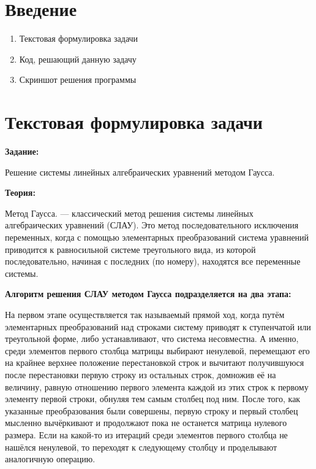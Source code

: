 \documentclass[12pt,a4paper]{scrartcl}
\begin{document}
\tableofcontents %

\newpage

\section{Введение}
\label{sec:intro}

\begin{enumerate}
 \item Текстовая формулировка задачи
 \item Код, решающий данную задачу
 \item Скриншот решения программы
\end{enumerate}
\section{Текстовая формулировка задачи} 
\textbf {Задание:} 

Решение системы линейных алгебраических уравнений методом Гаусса.

\textbf{Теория:}

Метод Гаусса\cite{Метод Гаусса:1}. — классический метод решения системы линейных алгебраических уравнений (СЛАУ). Это метод последовательного исключения переменных, когда с помощью элементарных преобразований система уравнений приводится к равносильной системе треугольного вида, из которой последовательно, начиная с последних (по номеру), находятся все переменные системы.

\textbf{Алгоритм решения СЛАУ методом Гаусса подразделяется на два этапа:}

На первом этапе осуществляется так называемый прямой ход, когда путём элементарных преобразований над строками систему приводят к ступенчатой или треугольной форме, либо устанавливают, что система несовместна. А именно, среди элементов первого столбца матрицы выбирают ненулевой, перемещают его на крайнее верхнее положение перестановкой строк и вычитают получившуюся после перестановки первую строку из остальных строк, домножив её на величину, равную отношению первого элемента каждой из этих строк к первому элементу первой строки, обнуляя тем самым столбец под ним. После того, как указанные преобразования были совершены, первую строку и первый столбец мысленно вычёркивают и продолжают пока не останется матрица нулевого размера. Если на какой-то из итераций среди элементов первого столбца не нашёлся ненулевой, то переходят к следующему столбцу и проделывают аналогичную операцию.
\end{document}
